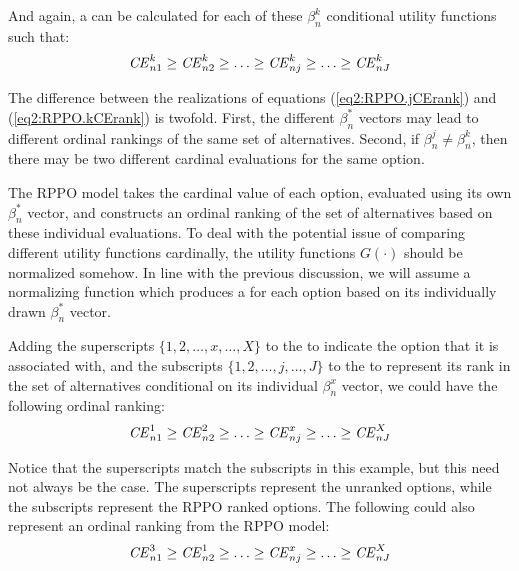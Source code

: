 \documentclass[../main.tex]{subfiles}
\begin{document}
\noindent And again, a {\CE} can be calculated for each of these $\beta_n^k$ conditional utility functions such that:
\begin{equation}
	\label{eq2:RPPO.kCErank}
	{\ensuremath{\mathit{CE}}}^k_{n1} \geq {\ensuremath{\mathit{CE}}}^k_{n2} \geq \ldots \geq {\ensuremath{\mathit{CE}}}^k_{nj} \geq \ldots \geq {\ensuremath{\mathit{CE}}}^k_{nJ}
\end{equation}

The difference between the realizations of equations (\ref{eq2:RPPO.jCErank}) and (\ref{eq2:RPPO.kCErank}) is twofold.
First, the different $\beta_n^*$ vectors may lead to different ordinal rankings of the same set of alternatives.
Second, if $\beta_n^j \neq \beta_n^k$, then there may be two different cardinal evaluations for the same option.

The RPPO model takes the cardinal value of each option, evaluated using its own $\beta_n^*$  vector, and constructs an ordinal ranking of the set of alternatives based on these individual evaluations.
To deal with the potential issue of comparing different utility functions cardinally, the utility functions $G(\cdot)$ should be normalized somehow.{\footnotemark}
In line with the previous discussion, we will assume a normalizing function which produces a {\CE} for each option based on its individually drawn $\beta_n^*$ vector.

\addtocounter{footnote}{-1}

Adding the superscripts $\{1,2,\ldots,x,\ldots,X\}$  to the {\CE} to indicate the option that it is associated with, and the subscripts $\{1,2,\ldots,j,\ldots,J\}$ to the {\CE} to represent its rank in the set of alternatives conditional on its individual $\beta_n^x$ vector, we could have the following ordinal ranking:
\begin{equation}
	\label{eq2:RPPO.CErank.f}
	{\ensuremath{\mathit{CE}}}^1_{n1} \geq {\ensuremath{\mathit{CE}}}^2_{n2} \geq \ldots \geq {\ensuremath{\mathit{CE}}}^x_{nj} \geq \ldots \geq {\ensuremath{\mathit{CE}}}^X_{nJ}
\end{equation}

Notice that the superscripts match the subscripts in this example, but this need not always be the case.
The superscripts represent the unranked options, while the subscripts represent the RPPO ranked options.
The following could also represent an ordinal ranking from the RPPO model:
\begin{equation}
	\label{eq2:RPPO.CErank.a}
	{\ensuremath{\mathit{CE}}}^3_{n1} \geq {\ensuremath{\mathit{CE}}}^1_{n2} \geq \ldots \geq {\ensuremath{\mathit{CE}}}^x_{nj} \geq \ldots \geq {\ensuremath{\mathit{CE}}}^X_{nJ}
\end{equation}
\end{document}
